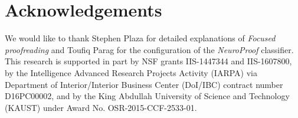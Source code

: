 
\section*{Acknowledgements}
We would like to thank Stephen Plaza for detailed explanations of \emph{Focused proofreading} and Toufiq Parag for the configuration of the \emph{NeuroProof} classifier. This research is supported in part by NSF grants IIS-1447344 and IIS-1607800, by the Intelligence Advanced Research Projects Activity (IARPA) via Department of Interior/Interior Business Center (DoI/IBC) contract number D16PC00002, and by the King Abdullah University of Science and Technology (KAUST) under Award No. OSR-2015-CCF-2533-01.



